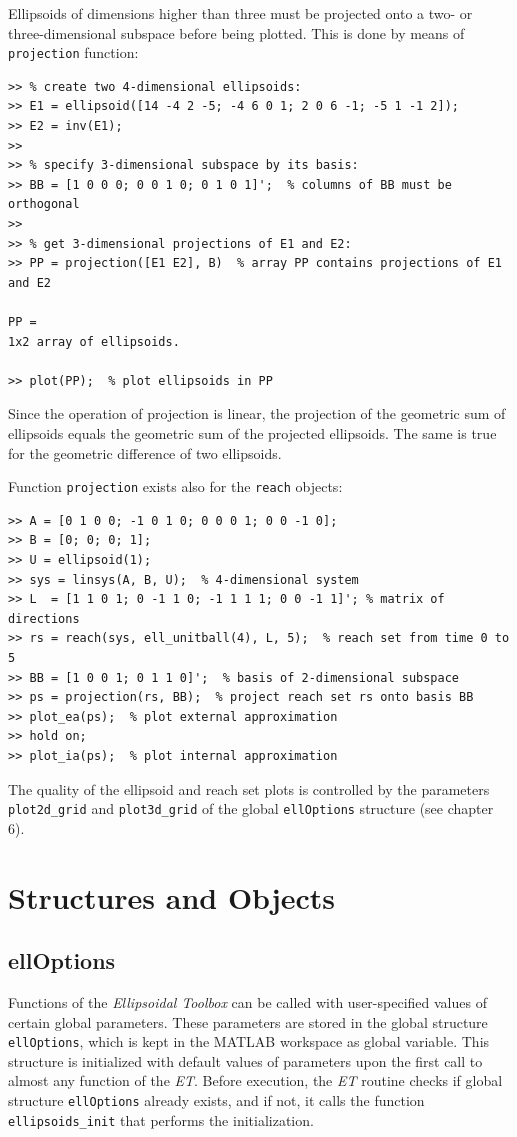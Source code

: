 \documentclass{report}
\begin{document}
Ellipsoids of dimensions higher than three must be
projected onto a two- or three-dimensional subspace before being plotted.
This is done by means of {\tt projection} function:
{\tt \begin{verbatim}
>> % create two 4-dimensional ellipsoids:
>> E1 = ellipsoid([14 -4 2 -5; -4 6 0 1; 2 0 6 -1; -5 1 -1 2]);
>> E2 = inv(E1);
>>
>> % specify 3-dimensional subspace by its basis:
>> BB = [1 0 0 0; 0 0 1 0; 0 1 0 1]';  % columns of BB must be orthogonal
>>
>> % get 3-dimensional projections of E1 and E2:
>> PP = projection([E1 E2], B)  % array PP contains projections of E1 and E2

PP =
1x2 array of ellipsoids.

>> plot(PP);  % plot ellipsoids in PP
\end{verbatim} }
Since the operation of projection is linear, the projection of the geometric
sum of ellipsoids equals the geometric sum of the projected ellipsoids.
The same is true for the geometric difference of two ellipsoids.

Function {\tt projection} exists also for the {\tt reach} objects:
{\tt \begin{verbatim}
>> A = [0 1 0 0; -1 0 1 0; 0 0 0 1; 0 0 -1 0];
>> B = [0; 0; 0; 1];
>> U = ellipsoid(1);
>> sys = linsys(A, B, U);  % 4-dimensional system
>> L  = [1 1 0 1; 0 -1 1 0; -1 1 1 1; 0 0 -1 1]'; % matrix of directions
>> rs = reach(sys, ell_unitball(4), L, 5);  % reach set from time 0 to 5
>> BB = [1 0 0 1; 0 1 1 0]';  % basis of 2-dimensional subspace
>> ps = projection(rs, BB);  % project reach set rs onto basis BB
>> plot_ea(ps);  % plot external approximation
>> hold on;
>> plot_ia(ps);  % plot internal approximation
\end{verbatim} }
The quality of the ellipsoid and reach set plots is controlled by the
parameters {\tt plot2d\_grid} and {\tt plot3d\_grid} of the global
{\tt ellOptions} structure (see chapter 6).





\chapter{Structures and Objects}
\section{ellOptions}
Functions of the {\it Ellipsoidal Toolbox} can be called with
user-specified values of certain global parameters. These parameters
are stored in the global structure {\tt ellOptions}, which is kept in the
MATLAB workspace as global variable. This structure is initialized with
default values of parameters upon the first call to almost any function
of the {\it ET}. Before  execution, the {\it ET} routine checks
if global structure {\tt ellOptions} already exists, and if not, it calls
the function {\tt ellipsoids\_init} that performs the initialization.
\end{document}
